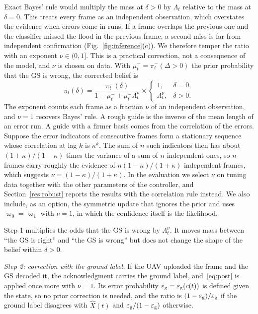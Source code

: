 \documentclass[5p,twocolumn]{elsarticle}
\theoremstyle{remark}
\newcommand{\ee}{\varepsilon}
\begin{document}
Exact Bayes' rule would multiply the mass at $\delta>0$ by $\Lambda_t$ relative to the mass at $\delta=0$. This treats every frame as an independent observation, which overstates the evidence when errors come in runs. If a frame overlaps the previous one and the classifier missed the flood in the previous frame, a second miss is far from independent confirmation (Fig.~\ref{fig:inference}(c)). We therefore temper the ratio with an exponent $\nu\in(0,1]$. This is a practical correction, not a consequence of the model, and $\nu$ is chosen on data. With $\mu^-_t=\pi^-_t(\Delta>0)$ the prior probability that the GS is wrong, the corrected belief is
\begin{equation}\label{eq:post}
\pi_t(\delta)=\frac{\pi^-_t(\delta)}{1-\mu^-_t+\mu^-_t\Lambda_t^{\nu}}\times\begin{cases}1, & \delta=0,\\ \Lambda_t^{\nu}, & \delta>0.\end{cases}
\end{equation}
The exponent counts each frame as a fraction $\nu$ of an independent observation, and $\nu=1$ recovers Bayes' rule. A rough guide is the inverse of the mean length of an error run. A guide with a firmer basis comes from the correlation of the errors. Suppose the error indicators of consecutive frames form a stationary sequence whose correlation at lag $k$ is $\kappa^k$. The sum of $n$ such indicators then has about $(1+\kappa)/(1-\kappa)$ times the variance of a sum of $n$ independent ones, so $n$ frames carry roughly the evidence of $n(1-\kappa)/(1+\kappa)$ independent frames, which suggests $\nu=(1-\kappa)/(1+\kappa)$. In the evaluation we select $\nu$ on tuning data together with the other parameters of the controller, and Section~\ref{res:robust} reports the results with the correlation rule instead. We also include, as an option, the symmetric update that ignores the prior and uses $\varpi_0=\varpi_1$ with $\nu=1$, in which the confidence itself is the likelihood.

Step 1 multiplies the odds that the GS is wrong by $\Lambda_t^{\nu}$. It moves mass between ``the GS is right'' and ``the GS is wrong'' but does not change the shape of the belief within $\delta>0$.

\emph{Step 2: correction with the ground label.} If the UAV uploaded the frame and the GS decoded it, the acknowledgment carries the ground label, and~\eqref{eq:post} is applied once more with $\nu=1$. Its error probability $\ee_{\rm g}=\ee_{\rm g}(c(t))$ is defined given the state, so no prior correction is needed, and the ratio is $(1-\ee_{\rm g})/\ee_{\rm g}$ if the ground label disagrees with $\hat X(t)$ and $\ee_{\rm g}/(1-\ee_{\rm g})$ otherwise.
\end{document}
